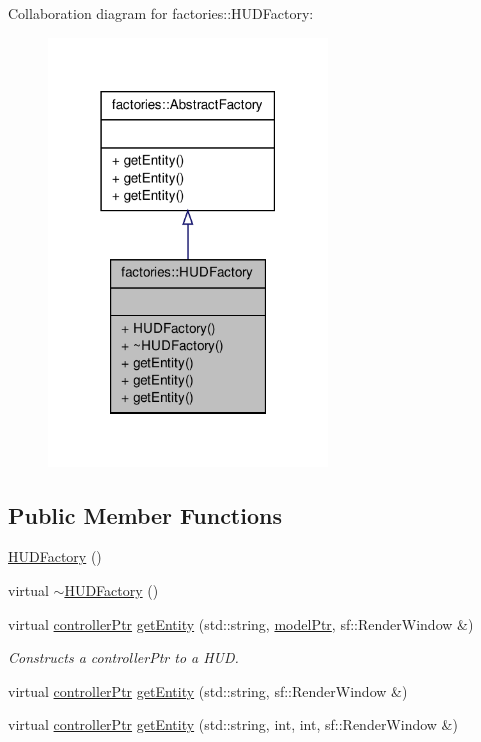 \-Collaboration diagram for factories\-:\-:\-H\-U\-D\-Factory\-:\nopagebreak
\begin{figure}[H]
\begin{center}
\leavevmode
\includegraphics[width=210pt]{dd/db6/classfactories_1_1HUDFactory__coll__graph}
\end{center}
\end{figure}
\subsection*{\-Public \-Member \-Functions}
\begin{DoxyCompactItemize}
\item 
\hyperlink{classfactories_1_1HUDFactory_ad7a49569458558b586c07da27276b325}{\-H\-U\-D\-Factory} ()
\item 
virtual \hyperlink{classfactories_1_1HUDFactory_a4475f46b84cec4cfa035dfe25c827f1a}{$\sim$\-H\-U\-D\-Factory} ()
\item 
virtual \hyperlink{Game_8h_a21b04f6cf2d5990b82725fac5ea2ce9a}{controller\-Ptr} \hyperlink{classfactories_1_1HUDFactory_a1e6ed81c506d5c249ccd368df8bceccb}{get\-Entity} (std\-::string, \hyperlink{ModelView_8h_a78966ddb517fca8d2b29a2bc5c31e74e}{model\-Ptr}, sf\-::\-Render\-Window \&)
\begin{DoxyCompactList}\small\item\em \-Constructs a controller\-Ptr to a \-H\-U\-D. \end{DoxyCompactList}\item 
virtual \hyperlink{Game_8h_a21b04f6cf2d5990b82725fac5ea2ce9a}{controller\-Ptr} \hyperlink{classfactories_1_1HUDFactory_ae5675b73f28d2477442c86af51dce2c2}{get\-Entity} (std\-::string, sf\-::\-Render\-Window \&)
\item 
virtual \hyperlink{Game_8h_a21b04f6cf2d5990b82725fac5ea2ce9a}{controller\-Ptr} \hyperlink{classfactories_1_1HUDFactory_a991c959cad9bc072b9785da1db3b2e3b}{get\-Entity} (std\-::string, int, int, sf\-::\-Render\-Window \&)
\end{DoxyCompactItemize}


